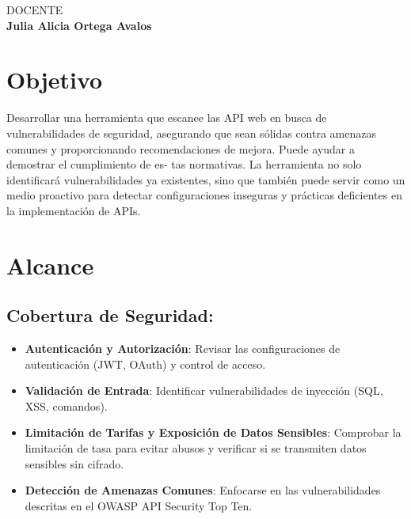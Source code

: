 \documentclass{article}
\begin{document}
        \vspace{0.8cm}
        \normalsize	
        DOCENTE \\
        \vspace{0.2cm}
        \large
        \textbf{Julia Alicia Ortega Avalos}

        \vspace{1cm}
        
        \vspace{1cm}
        \large
	
	\newpage
    
    \section{Objetivo}

    Desarrollar una herramienta que escanee las API web en busca de vulnerabilidades de seguridad, asegurando que sean sólidas contra amenazas comunes y proporcionando recomendaciones de mejora. Puede ayudar a demostrar el cumplimiento de es- tas normativas. La herramienta no solo identificará vulnerabilidades ya existentes, sino que también puede servir como un medio proactivo para detectar configuraciones inseguras y prácticas deficientes en la implementación de APIs.

    \section{Alcance}

    \subsection{Cobertura de Seguridad:}
    \begin{itemize}
        \item \textbf{Autenticación y Autorización}: Revisar las configuraciones de autenticación (JWT, OAuth) y control de acceso.
        \item \textbf{Validación de Entrada}: Identificar vulnerabilidades de inyección (SQL, XSS, comandos).
        \item \textbf{Limitación de Tarifas y Exposición de Datos Sensibles}: Comprobar la limitación de tasa para evitar abusos y verificar si se transmiten datos sensibles sin cifrado.
        \item \textbf{Detección de Amenazas Comunes}: Enfocarse en las vulnerabilidades descritas en el OWASP API Security Top Ten.
    \end{itemize}
\end{document}
